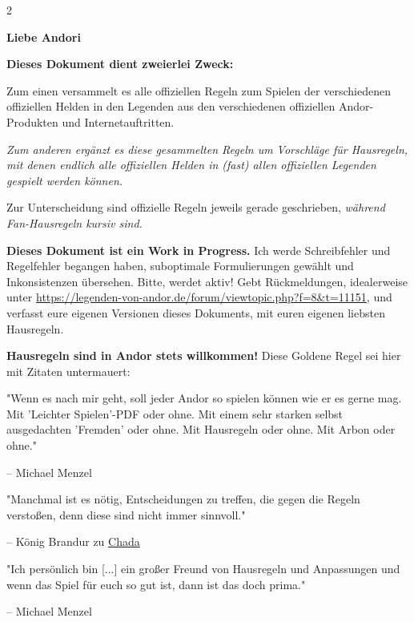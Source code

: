 \documentclass[10pt, a4paper, oneside]{book}
\newcommand{\fan}[1]{\textit{#1}}
\begin{document}
\begin{multicols*}{2}\raggedcolumns



\textbf{Liebe Andori}
\bigskip

\textbf{Dieses Dokument dient zweierlei Zweck:} 

Zum einen versammelt es alle offiziellen Regeln zum Spielen der verschiedenen offiziellen Helden in den Legenden aus den verschiedenen offiziellen Andor-Produkten und Internetauftritten.

\fan{Zum anderen ergänzt es diese gesammelten Regeln um Vorschläge für Hausregeln, mit denen endlich alle offiziellen Helden in (fast) allen offiziellen Legenden gespielt werden können.}

Zur Unterscheidung sind offizielle Regeln jeweils gerade geschrieben, \fan{während Fan-Hausregeln kursiv sind.}\bigskip


\textbf{Dieses Dokument ist ein Work in Progress.} Ich werde Schreibfehler und Regelfehler begangen haben, suboptimale Formulierungen gewählt und Inkonsistenzen übersehen. Bitte, werdet aktiv! Gebt Rückmeldungen, idealerweise unter \url{https://legenden-von-andor.de/forum/viewtopic.php?f=8&t=11151}, und verfasst eure eigenen Versionen dieses Dokuments, mit euren eigenen liebsten Hausregeln.
\bigskip

\textbf{Hausregeln sind in Andor stets willkommen!} Diese Goldene Regel sei hier mit Zitaten untermauert:

\bigskip

"Wenn es nach mir geht, soll jeder Andor so spielen können wie er es gerne mag. Mit 'Leichter Spielen'-PDF oder ohne. Mit einem sehr starken selbst ausgedachten 'Fremden' oder ohne. Mit Hausregeln oder ohne. Mit Arbon oder ohne." 

– Michael Menzel
\supercite{6390}

\bigskip

"Manchmal ist es nötig, Entscheidungen zu treffen, die gegen die Regeln verstoßen, denn diese sind nicht immer sinnvoll."

– König Brandur zu \hyperref[bogenschuetzin]{Chada}
\supercite{ldk-der-koenig-von-andor}

\bigskip

"Ich persönlich bin [...] ein großer Freund von Hausregeln und Anpassungen und wenn das Spiel für euch so gut ist, dann ist das doch prima." 

– Michael Menzel
\supercite{32174}

\bigskip


\end{multicols*}
\end{document}
